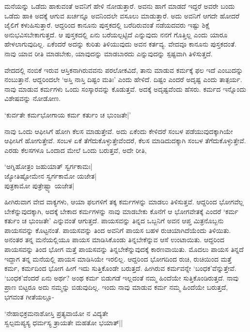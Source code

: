 ಮನೆಯನ್ನು ಒಡೆದು ಹಾಕುವಂತೆ ಅವನಿಗೆ ಹೇಳಿ ನೋಡುತ್ತಾರೆ. ಅವನು ಹಾಗೆ ಮಾಡದೆ ಇದ್ದರೆ ಅವರೇ ಬಂದು ಒಡೆದು ಹಾಕಿ ಅದಕ್ಕೆ ಆಗುವ ಖರ್ಚನ್ನೂ ಅವನಿಂದಲೇ ವಸೂಲು ಮಾಡುತ್ತಾರೆ. ಅದು ಅವನಿಗೆ ಆಗದೇ ಹೋದರೆ ಜೈಲಿಗೆ ಕಳುಹಿಸುತ್ತಾರೆ. ಆದ್ದರಿಂದ ಕಾನೂನು ಪುಸ್ತಕದಲ್ಲಿ ಬರೆದಿರುವಂತೆ ನಡೆಯದವರು ಇಷ್ಟು ಶಿಕ್ಷೆ ಅನುಭವಿಸಬೇಕಾಗುತ್ತದೆ. ಆ ಪುಸ್ತಕದಲ್ಲಿ ಏನು ಬರೆಯಲ್ಪಟ್ಟಿದೆ ಎನ್ನುವುದು ನನಗೆ ಗೊತ್ತಿಲ್ಲ ಎಂದು ಯಾರೂ ಹೇಳಲಾಗುವುದಿಲ್ಲ. ಏಕೆಂದರೆ ಅದನ್ನು ಕುರಿತು ತಿಳಿಯುವುದು ಅವನ ಕರ್ತವ್ಯ. ವೇದವೂ ಕಾನೂನು ಪುಸ್ತಕದಂತೆ. ನಾವು ಯಾವ ರೀತಿ ಮಾಡಬೇಕು, ಯಾವುದನ್ನು ಮಾಡಬಾರದು ಎನ್ನುವುದನ್ನು ಸ್ಪಷ್ಟವಾಗಿ ತಿಳಿಸುತ್ತದೆ.

ವೇದದಲ್ಲಿ ನಂಬಿಕೆ ಇರುವ ಆಸ್ತಿಕನಾಗಿರುವವನು ಪರಲೋಕವಿದೆ, ತಾನು ಮಾಡುವ ಕರ್ಮಕ್ಕೆ ಫಲ ಇದೆ ಎಂಬುದನ್ನು ನಂಬುತ್ತಾನೆ. ಆದ್ದರಿಂದಲೇ `ಅಸ್ತಿ ನಾಸ್ತಿ ದಿಷ್ಟಂ ಮತಿಃ'  ಎಂದು ಹೇಳಿದೆ. ದಿಷ್ಟಂ ಎಂದರೆ ಅದೃಷ್ಟ ಎಂದು ತಾತ್ಪರ್ಯ. ನಾವು ಮಾಡುವ ಕರ್ಮಗಳು ಒಂದು ಸಂಸ್ಕಾರವನ್ನು ಕೊಡುತ್ತವೆ. ಅದಕ್ಕೆ ಅದೃಷ್ಟವೆಂದು ಹೆಸರು. ಕರ್ಮದ ಇನ್ನೊಂದು ವಿಶೇಷವನ್ನು ನೋಡೋಣ.

\begin{shloka}
`ಕುರ್ವತೇ ಕರ್ಮಭೋಗಾಯ ಕರ್ಮ ಕರ್ತುಂ ಚ ಭುಂಜತೇ|'
\end{shloka}

ನಾವು ಒಂದು ಆಫೀಸಿಗೆ ಹೋಗಿ ಕೆಲಸ ಮಾಡುತ್ತೇವೆ. ಅದು ಏಕೆಂದು ಕೇಳಿದರೆ ಸಂಬಳ ಪಡೆಯುವುದಕ್ಕಾಗಿಯೇ ಆಫೀಸಿಗೆ ಹೋಗುತ್ತೇವೆ. ಸಂಬಳ ಏಕೆ ತೆಗೆದುಕೊಳ್ಳುತ್ತೇವೆಂದರೆ, ಕೆಲಸ ಮಾಡಿದುದಕ್ಕಾಗಿ ಸಂಬಳ ತೆಗೆದುಕೊಳ್ಳುತ್ತೇವೆ. ಎರಡು ಕೆಲಸಗಳೂ ಒಂದಾದ ಮೇಲೆ ಒಂದು ಬರುತ್ತವೆ, ಅದೇ ರೀತಿ,

\begin{shloka}
`ಅಗ್ನಿಹೋತ್ರಂ ಜಹುಯಾತ್ ಸ್ವರ್ಗಕಾಮಃ|\\
ಜ್ಯೋತಿಷ್ಟೋಮೇನ ಸ್ವರ್ಗಕಾಮೋ ಯಜೇತ|\\
ಪುತ್ರಕಾಮೋ ಪುತ್ರೇಷ್ಟ್ಯಾ ಯಜೇತ|
\end{shloka}

ಹೀಗಿರುವಾಗ ವೇದ ವಾಕ್ಯಗಳು, ಆಯಾ ಫಲಗಳಿಗೆ ತಕ್ಕ ಕರ್ಮಗಳನ್ನು ಮಾಡಲು ತಿಳಿಸುತ್ತವೆ. ಆದ್ದರಿಂದ ಭೋಗವೆಲ್ಲ ಬೇಕೆನ್ನುವುದಕ್ಕಾಗಿ, ಅದಕ್ಕೆ ಬೇಕಾದ ಕರ್ಮಗಳನ್ನು ನಾವು ಮಾಡಬೇಕು ಕೊನೆಗೆ ಆ ಭೋಗವೇತಕ್ಕೆ ಎಂದರೆ `ಕರ್ಮ ಕರ್ತುಂ ಚ ಭುಂಜತೇ' ಎನ್ನುವಂತೆ ಆಗುತ್ತದೆ. ಪಾಯಸವನ್ನು ತಿನ್ನದ ಒಬ್ಬನಿಗೆ ಅವನ ಆಪ್ತ ಮಿತ್ರನೊಬ್ಬನು ಪಾಯಸವನ್ನು ಕೊಟ್ಟನಂತೆ. ಪಾಯಸವನ್ನು ತಿಂದ ಅವನಿಗೆ ಪಾಯಸ ಬಹಳ ರುಚಿಯಾಗಿದೆಯೆಂದು ತಿಳಿಯಿತು. ಅನಂತರ ತನ್ನ ಮನೆಯಲ್ಲಿಯೂ ಪಾಯಸ ಮಾಡಿಸಿಕೊಂಡು ತಿನ್ನಬೇಕೆನ್ನುವ ಆಸೆ ಉಂಟಾಯಿತು. ಆದ್ದರಿಂದ ಪಾಯಸವನ್ನು ತಿಂದ ಭೋಗ ಮತ್ತೆ ಪಾಯಸವನ್ನು ತಿನ್ನಬೇಕೆನ್ನುವುದಕ್ಕೆ ಕಾರಣವಾಯಿತು. ಮೊದಲು ಪಾಯಸ ತಿನ್ನದೆ ಇದ್ದಾಗ ತನ್ನ ಮನೆಯಲ್ಲಿ ಪಾಯಸ ಮಾಡಿಸಿಯೇ ಇರಲಿಲ್ಲ. ಆದ್ದರಿಂದ ಭೋಗದಿಂದ ರುಚಿ, ರುಚಿಯಿಂದ ಮತ್ತೆ ಕರ್ಮ, ಕರ್ಮದಿಂದ ಭೋಗ ಹೀಗೆ ಇದು ಸುತ್ತಿಕೊಂಡೇ ಬರುತ್ತದೆ. ಹೀಗಿರುವ ಕರ್ಮವನ್ನೇ `ಬಂಧಕ'ವೆನ್ನುತ್ತೇವೆ. `ಬಂಧಕ'ವೆಂದರೆ ಏನು ಅರ್ಥ? ಅಂಥ ಕರ್ಮ ಬಿಡುಗಡೆ ಇಲ್ಲದಂತೆ ನಮ್ಮ ಹಿಂದೆಯೇ ಸುತ್ತಿಕೊಂಡಿರುತ್ತದೆ. ನಾವು ಪ್ರಾಣ ಬಿಟ್ಟರೂ ಅದು ನಮ್ಮನ್ನು ಬಿಡುವುದಿಲ್ಲ. ಇಂದು ನಾವು ಮಾಡುವ ಕರ್ಮ ನಮ್ಮ ಹಿಂದೆಯೇ ಬರುತ್ತದೆ, ಭಗವಂತ ಗೀತೆಯಲ್ಲೂ-

\begin{shloka}
`ನೇಹಾಭಿಕ್ರಮನಾಶೋಸ್ತಿ ಪ್ರತ್ಯವಾಯೋ ನ ವಿದ್ಯತೇ\\
ಸ್ವಲ್ಪಮಪ್ಯಸ್ಯ ಧರ್ಮಸ್ಯ ತ್ರಾಯತೇ ಮಹತೋ ಭಯಾತ್||
\end{shloka}

